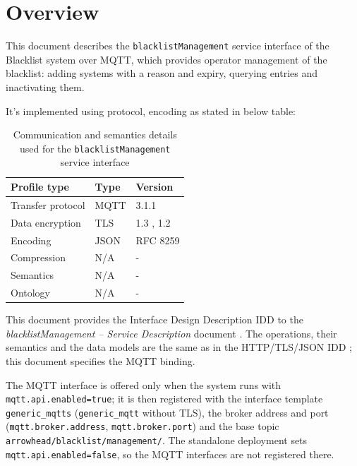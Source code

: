 \documentclass[a4paper]{arrowhead}
\begin{document}
\section{Overview}
\label{sec:overview}

This document describes the \texttt{blacklist\allowbreak{}Management} service interface of the Blacklist system over MQTT, which provides operator management of the blacklist: adding systems with a reason and expiry, querying entries and inactivating them.

It's implemented using protocol, encoding as stated in below table:
\begin{table}[ht!]
  \centering
  \begin{tabular}{|l|l|l|}
    \hline
    \rowcolor{gray!33} Profile type & Type & Version \\ \hline
    Transfer protocol & MQTT & 3.1.1 \cite{mqtt311} \\ \hline
    Data encryption & TLS & 1.3 \cite{rfc8446}, 1.2 \cite{rfc5246} \\ \hline
    Encoding & JSON & RFC 8259 \cite{rfc8259} \\ \hline
    Compression & N/A & - \\ \hline
    Semantics & N/A & - \\ \hline
    Ontology & N/A & - \\ \hline
  \end{tabular}
  \caption{Communication and semantics details used for the \texttt{blacklist\allowbreak{}Management} service interface}
  \label{tab:comunication_semantics_profile}
\end{table}

This document provides the Interface Design Description IDD to the \textit{blacklistManagement -- Service Description} document \cite{bl-blacklistManagement-sd}.
The operations, their semantics and the data models are the same as in the HTTP/TLS/JSON IDD \cite{bl-blacklistManagement-http-idd}; this document specifies the MQTT binding.

The MQTT interface is offered only when the system runs with \texttt{mqtt.api.enabled=true}; it is then registered with the interface template \texttt{generic\_\allowbreak{}mqtts} (\texttt{generic\_\allowbreak{}mqtt} without TLS), the broker address and port (\texttt{mqtt.\allowbreak{}broker.\allowbreak{}address}, \texttt{mqtt.\allowbreak{}broker.\allowbreak{}port}) and the base topic \texttt{arrowhead/\allowbreak{}blacklist/\allowbreak{}management/\allowbreak{}}. The standalone deployment sets \texttt{mqtt.\allowbreak{}api.\allowbreak{}enabled=\allowbreak{}false}, so the MQTT interfaces are not registered there.
\end{document}
